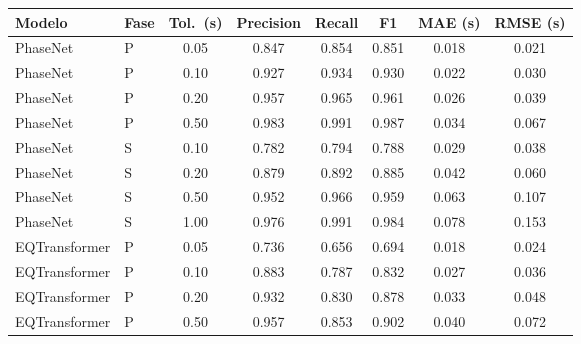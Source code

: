 \begin{table}[ht!]
  \centering
  \small
  \begin{tabular}{@{}llcccccc@{}}
    \toprule
    \textbf{Modelo} & \textbf{Fase} & \textbf{Tol.\ (s)} & \textbf{Precision} & \textbf{Recall} & \textbf{F1} & \textbf{MAE (s)} & \textbf{RMSE (s)} \\
    \midrule
    PhaseNet        & P             & 0.05               & 0.847              & 0.854           & 0.851       & 0.018            & 0.021             \\
    PhaseNet        & P             & 0.10               & 0.927              & 0.934           & 0.930       & 0.022            & 0.030             \\
    PhaseNet        & P             & 0.20               & 0.957              & 0.965           & 0.961       & 0.026            & 0.039             \\
    PhaseNet        & P             & 0.50               & 0.983              & 0.991           & 0.987       & 0.034            & 0.067             \\
    PhaseNet        & S             & 0.10               & 0.782              & 0.794           & 0.788       & 0.029            & 0.038             \\
    PhaseNet        & S             & 0.20               & 0.879              & 0.892           & 0.885       & 0.042            & 0.060             \\
    PhaseNet        & S             & 0.50               & 0.952              & 0.966           & 0.959       & 0.063            & 0.107             \\
    PhaseNet        & S             & 1.00               & 0.976              & 0.991           & 0.984       & 0.078            & 0.153             \\
    \midrule
    EQTransformer   & P             & 0.05               & 0.736              & 0.656           & 0.694       & 0.018            & 0.024             \\
    EQTransformer   & P             & 0.10               & 0.883              & 0.787           & 0.832       & 0.027            & 0.036             \\
    EQTransformer   & P             & 0.20               & 0.932              & 0.830           & 0.878       & 0.033            & 0.048             \\
    EQTransformer   & P             & 0.50               & 0.957              & 0.853           & 0.902       & 0.040            & 0.072             \\

\end{tabular}
\end{table}
